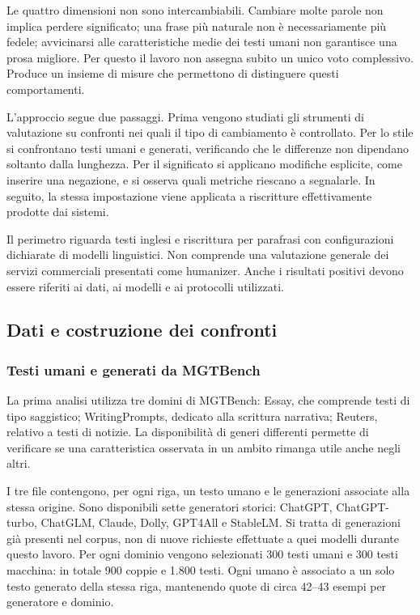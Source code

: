 Le quattro dimensioni non sono intercambiabili. Cambiare molte parole non implica perdere significato; una frase più naturale non è necessariamente più fedele; avvicinarsi alle caratteristiche medie dei testi umani non garantisce una prosa migliore. Per questo il lavoro non assegna subito un unico voto complessivo. Produce un insieme di misure che permettono di distinguere questi comportamenti.

L'approccio segue due passaggi. Prima vengono studiati gli strumenti di valutazione su confronti nei quali il tipo di cambiamento è controllato. Per lo stile si confrontano testi umani e generati, verificando che le differenze non dipendano soltanto dalla lunghezza. Per il significato si applicano modifiche esplicite, come inserire una negazione, e si osserva quali metriche riescano a segnalarle. In seguito, la stessa impostazione viene applicata a riscritture effettivamente prodotte dai sistemi.

Il perimetro riguarda testi inglesi e riscrittura per parafrasi con configurazioni dichiarate di modelli linguistici. Non comprende una valutazione generale dei servizi commerciali presentati come humanizer. Anche i risultati positivi devono essere riferiti ai dati, ai modelli e ai protocolli utilizzati.

\subsection{Dati e costruzione dei confronti}\label{dati-e-costruzione-dei-confronti}

\subsubsection{Testi umani e generati da MGTBench}\label{testi-umani-e-generati-da-mgtbench}

La prima analisi utilizza tre domini di MGTBench: Essay, che comprende testi di tipo saggistico; WritingPrompts, dedicato alla scrittura narrativa; Reuters, relativo a testi di notizie. La disponibilità di generi differenti permette di verificare se una caratteristica osservata in un ambito rimanga utile anche negli altri.

I tre file contengono, per ogni riga, un testo umano e le generazioni associate alla stessa origine. Sono disponibili sette generatori storici: ChatGPT, ChatGPT-turbo, ChatGLM, Claude, Dolly, GPT4All e StableLM. Si tratta di generazioni già presenti nel corpus, non di nuove richieste effettuate a quei modelli durante questo lavoro. Per ogni dominio vengono selezionati 300 testi umani e 300 testi macchina: in totale 900 coppie e 1.800 testi. Ogni umano è associato a un solo testo generato della stessa riga, mantenendo quote di circa 42--43 esempi per generatore e dominio.

